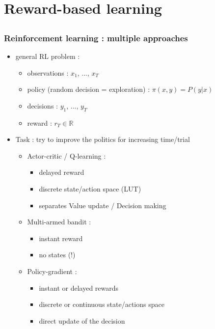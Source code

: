 \documentclass{beamer}
\begin{document}
\section{Reward-based learning}
\subsection*{}

\begin{frame} \frametitle{Reinforcement learning : multiple approaches}
  \begin{itemize}
    \item general RL problem :
    \begin{itemize}
      \item observations : $x_1$, ..., $x_T$
      \item policy (random decision = exploration) : $\pi(x,y) = P(y|x)$
      \item decisions : $y_1$, ..., $y_T$
      \item reward : $r_T \in \mathbb{R}$ 	
    \end{itemize}
    \item Task : try to improve the politics for increasing time/trial
    \begin{itemize}
      \item Actor-critic / Q-learning : 
      \begin{itemize}
       \item delayed reward
       \item discrete state/action space (LUT)
       \item separates Value update / Decision making 
      \end{itemize}
      \item Multi-armed bandit : 
      \begin{itemize}
        \item instant reward
        \item no states (!)
      \end{itemize}  
      \item Policy-gradient : 
      \begin{itemize}
        \item instant or delayed rewards
        \item discrete or continuous state/actions space
        \item direct update of the decision
      \end{itemize}  
    \end{itemize}
  \end{itemize}
\end{frame}
\end{document}

